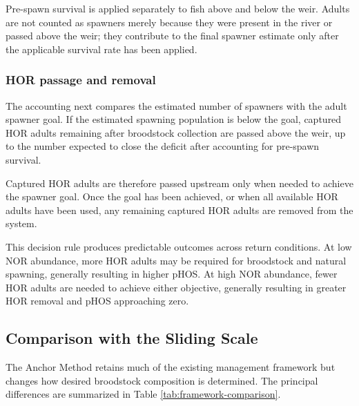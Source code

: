 \documentclass[12pt,letterpaper]{article}
\begin{document}
Pre-spawn survival is applied separately to fish above and below the weir. Adults are not counted as spawners merely because they were present in the river or passed above the weir; they contribute to the final spawner estimate only after the applicable survival rate has been applied.

\subsubsection{HOR passage and removal}\label{hor-passage-and-removal}

The accounting next compares the estimated number of spawners with the adult spawner goal. If the estimated spawning population is below the goal, captured HOR adults remaining after broodstock collection are passed above the weir, up to the number expected to close the deficit after accounting for pre-spawn survival.

Captured HOR adults are therefore passed upstream only when needed to achieve the spawner goal. Once the goal has been achieved, or when all available HOR adults have been used, any remaining captured HOR adults are removed from the system.

This decision rule produces predictable outcomes across return conditions. At low NOR abundance, more HOR adults may be required for broodstock and natural spawning, generally resulting in higher pHOS. At high NOR abundance, fewer HOR adults are needed to achieve either objective, generally resulting in greater HOR removal and pHOS approaching zero.

\subsection{Comparison with the Sliding Scale}\label{comparison-with-the-sliding-scale}

The Anchor Method retains much of the existing management framework but changes how desired broodstock composition is determined. The principal differences are summarized in Table \ref{tab:framework-comparison}.
\end{document}
